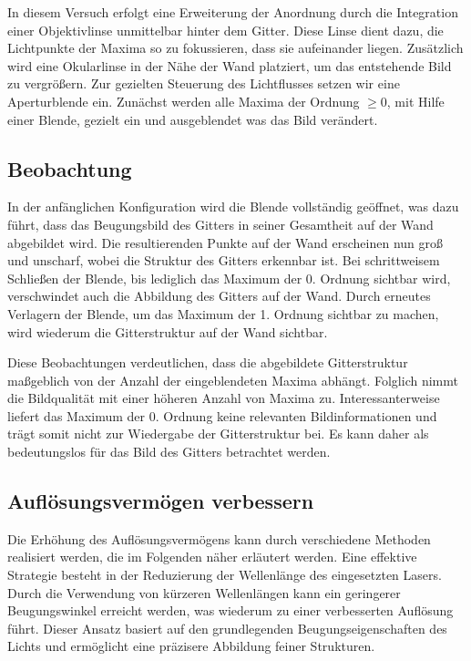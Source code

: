     In diesem Versuch erfolgt eine Erweiterung der Anordnung durch die Integration einer Objektivlinse unmittelbar hinter dem Gitter. Diese Linse dient dazu, die Lichtpunkte der Maxima so zu fokussieren, dass sie aufeinander liegen. Zusätzlich wird eine Okularlinse in der Nähe der Wand platziert, um das entstehende Bild zu vergrößern. Zur gezielten Steuerung des Lichtflusses setzen wir eine Aperturblende ein. Zunächst werden alle Maxima der Ordnung $\geq 0$, mit Hilfe einer Blende, gezielt ein und ausgeblendet was das Bild verändert.


    \subsection{Beobachtung}

        In der anfänglichen Konfiguration wird die Blende vollständig geöffnet, was dazu führt, dass das Beugungsbild des Gitters in seiner Gesamtheit auf der Wand abgebildet wird. Die resultierenden Punkte auf der Wand erscheinen nun groß und unscharf, wobei die Struktur des Gitters erkennbar ist. Bei schrittweisem Schließen der Blende, bis lediglich das Maximum der 0. Ordnung sichtbar wird, verschwindet auch die Abbildung des Gitters auf der Wand. Durch erneutes Verlagern der Blende, um das Maximum der 1. Ordnung sichtbar zu machen, wird wiederum die Gitterstruktur auf der Wand sichtbar.

        Diese Beobachtungen verdeutlichen, dass die abgebildete Gitterstruktur maßgeblich von der Anzahl der eingeblendeten Maxima abhängt. Folglich nimmt die Bildqualität mit einer höheren Anzahl von Maxima zu. Interessanterweise liefert das Maximum der 0. Ordnung keine relevanten Bildinformationen und trägt somit nicht zur Wiedergabe der Gitterstruktur bei. Es kann daher als bedeutungslos für das Bild des Gitters betrachtet werden.

    \subsection{Auflösungsvermögen verbessern}
    
        Die Erhöhung des Auflösungsvermögens kann durch verschiedene Methoden realisiert werden, die im Folgenden näher erläutert werden. Eine effektive Strategie besteht in der Reduzierung der Wellenlänge des eingesetzten Lasers. Durch die Verwendung von kürzeren Wellenlängen kann ein geringerer Beugungswinkel erreicht werden, was wiederum zu einer verbesserten Auflösung führt. Dieser Ansatz basiert auf den grundlegenden Beugungseigenschaften des Lichts und ermöglicht eine präzisere Abbildung feiner Strukturen.


